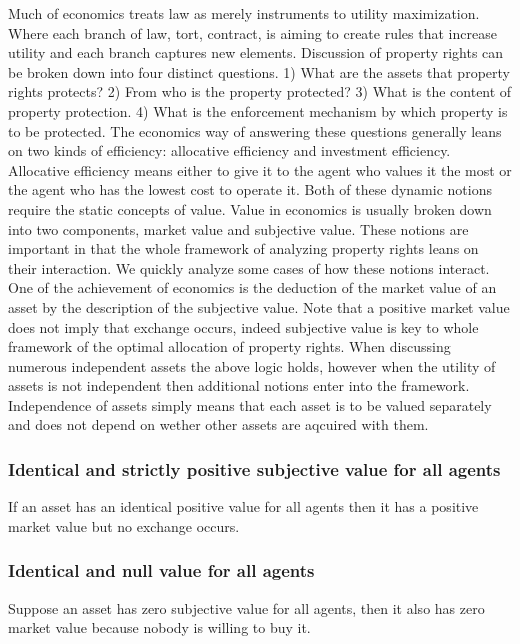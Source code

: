 \documentclass[12pt]{article}
\numberwithin{equation}{section}
\begin{document}
Much of economics treats law as merely instruments to utility maximization. Where each branch of law, tort, contract, is aiming to create rules that increase utility and each branch captures new elements. Discussion of property rights can be broken down into four distinct questions. 1) What are the assets that property rights protects? 2) From who is the property protected? 3) What is the content of property protection. 4) What is the enforcement mechanism by which property is to be protected. The economics way of answering these questions generally leans on two kinds of efficiency: allocative efficiency and investment efficiency. Allocative efficiency means either to give it to the agent who values it the most or the agent who has the lowest cost to operate it. Both of these dynamic notions require the static concepts of value. Value in economics is usually broken down into two components, market value and subjective value. These notions are important in that the whole framework of analyzing property rights leans on their interaction. We quickly analyze some cases of how these notions interact. One of the achievement of economics is the deduction of the market value of an asset by the description of the subjective value. Note that a positive market value does not imply that exchange occurs, indeed subjective value is key to whole framework of the optimal allocation of property rights. When discussing numerous independent assets the above logic holds, however when the utility of assets is not independent then additional notions enter into the framework. Independence of assets simply means that each asset is to be valued separately and does not depend on wether other assets are aqcuired with them. 


\subsubsection{Identical and strictly positive subjective value for all agents}

If an asset has an identical positive value for all agents then it has a positive market value but no exchange occurs. 

\subsubsection{Identical and null value for all agents}

Suppose an asset has zero subjective value for all agents, then it also has zero market value because nobody is willing to buy it. 
\end{document}
